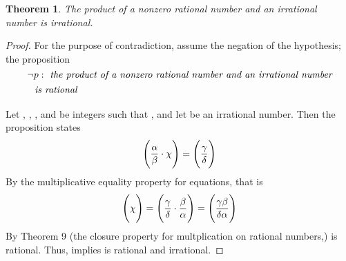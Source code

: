 \documentclass[preview]{standalone}
\newtheorem{theorem}{Theorem}
\begin{document}
\begin{theorem} %
    The product of a nonzero rational number and an irrational\\number is 
    irrational.
\end{theorem}

\begin{proof}
    For the purpose of contradiction, assume the negation of the hypothesis; 
    the proposition 
        $$\lnot p : \emph{ the product of a nonzero rational number and an 
        irrational number}$$
        $\indent \indent \emph{is rational}$
        \\ \\
    Let \bm{$\alpha$}, \bm{$\beta$}, \bm{$\gamma$}, and \bm{$\delta$} be integers such that 
    , and let \bm{$\chi$} be an irrational number. 
    Then the proposition  states 
    \begin{equation*}
        \Bigg(
            \frac{\alpha}{\beta} \space \cdot \space \chi 
        \Bigg)
            = 
        \Bigg(
            \frac{\gamma}{\delta}
        \Bigg)
    \end{equation*}    
    By the multiplicative equality property for equations, that is
    \begin{equation*}
        \Bigg(
            \chi
        \Bigg) 
            = 
        \Bigg(
            \frac{\gamma}{\delta} \space \cdot \space \frac{\beta}{\alpha} 
        \Bigg)
            =
        \Bigg( 
            \frac{\gamma\beta}{\delta\alpha}
        \Bigg)
    \end{equation*}
    By Theorem 9 (the closure property for multplication on rational numbers,) 
    \bm{$\chi$} is rational. 
    Thus,  implies \bm{$\chi$} is rational and irrational.
\end{proof}
\end{document}

